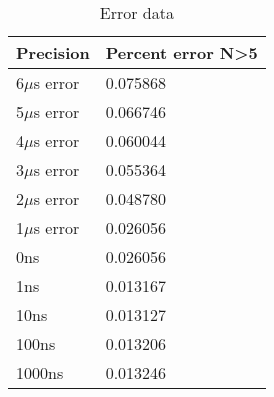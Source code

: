 \documentclass{article}
\begin{document}
\begin{minipage}[t]{0.5\textwidth}
\begin{table}[H]
\centering
\caption{Error data}
\label{my-label}
\begin{tabular}{|l|l|}
\hline
\textbf{Precision} & \textbf{Percent error N\textgreater{}5} \\ \hline
\rowcolor[HTML]{FE0000}
6$\mu$s error          & 0.075868                                \\ \hline
\rowcolor[HTML]{FE0000}
5$\mu$s error          & 0.066746                                \\ \hline
\rowcolor[HTML]{FE0000}
4$\mu$s error          & 0.060044                                \\ \hline
\rowcolor[HTML]{FE0000}
3$\mu$s error          & 0.055364                                \\ \hline
\rowcolor[HTML]{FE0000}
2$\mu$s error          & 0.048780                                \\ \hline
\rowcolor[HTML]{FE0000}
1$\mu$s error          & 0.026056                                \\ \hline
0ns                & 0.026056                                \\ \hline
1ns                & 0.013167                                \\ \hline
10ns               & 0.013127                                \\ \hline
100ns              & 0.013206                                \\ \hline
1000ns             & 0.013246                                \\ \hline
\end{tabular}
\end{table}
\end{minipage}
\end{document}

